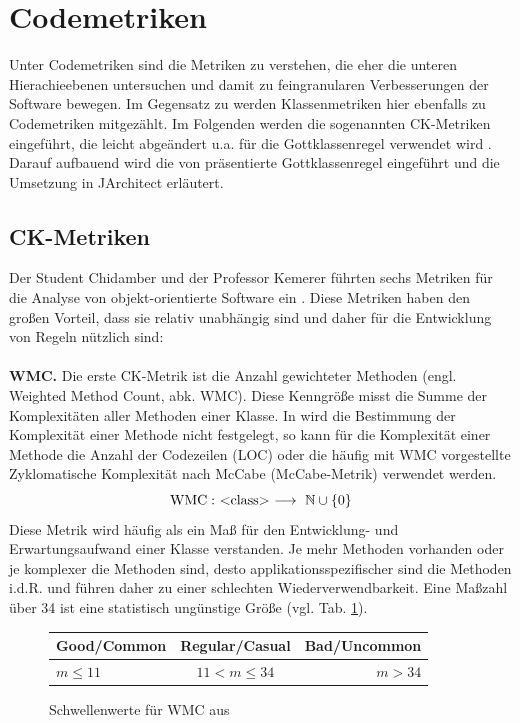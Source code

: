 \documentclass[12pt]{article}
\newcommand{\type}[1]{<\negthickspace\text{#1}\negthickspace> }
\begin{document}
\section{Codemetriken}\label{codem}

Unter Codemetriken sind die Metriken zu verstehen, die eher die
unteren Hierachieebenen untersuchen und damit zu feingranularen
Verbesserungen der Software bewegen. Im Gegensatz zu \cite{Sne10}
werden Klassenmetriken hier ebenfalls zu Codemetriken mitgezählt.
Im Folgenden werden die sogenannten CK-Metriken eingeführt, die
leicht abgeändert u.a. für die Gottklassenregel verwendet wird
\cite{Mar04}. Darauf aufbauend wird die von \cite{Mar04}
präsentierte Gottklassenregel eingeführt und die Umsetzung in
JArchitect erläutert. 

\subsection{CK-Metriken}
\label{sec:CK-Metriken}
Der Student Chidamber und der Professor Kemerer führten sechs
Metriken für die Analyse von objekt-orientierte Software ein
\cite{chi94}. Diese Metriken haben den großen Vorteil, dass sie
relativ unabhängig sind und daher für die Entwicklung von Regeln
nützlich sind: 
~\\
\\
\textbf{WMC.} Die erste CK-Metrik ist die Anzahl gewichteter Methoden
(engl. Weighted Method Count, abk. WMC). Diese Kenngröße
misst die Summe der Komplexitäten aller Methoden einer Klasse.
In \cite{chi94} wird die Bestimmung der Komplexität einer Methode
nicht festgelegt, so kann für die Komplexität einer Methode die
Anzahl der Codezeilen (LOC) oder die häufig mit WMC vorgestellte
Zyklomatische Komplexität nach McCabe (McCabe-Metrik) verwendet werden.
\[
        \text{WMC}: ~ 
        \type{class}
        ~ \longrightarrow ~ \mathbb{N}  \cup \left\{ 0 \right\} 
\]
Diese Metrik wird häufig als ein Maß für den Entwicklung- und
Erwartungsaufwand einer Klasse verstanden. Je mehr Methoden
vorhanden oder je komplexer die Methoden sind, desto
applikationsspezifischer sind die Methoden i.d.R. und führen
daher zu einer schlechten Wiederverwendbarkeit. Eine Maßzahl über
34 ist eine statistisch ungünstige Größe (vgl.
Tab. \ref{tab:wmcthreshold}).
\begin{figure}[H]
\centering
 \begin{tabular}{lcr}
    \toprule
    Good/Common & Regular/Casual & Bad/Uncommon \\
    \midrule
    $m \leq 11$ & $11 < m \leq 34$ & $m > 34$ \\
    \bottomrule
  \end{tabular}
  \caption{Schwellenwerte für WMC aus \cite{Fil15}}
  \label{tab:wmcthreshold}
\end{figure}
\end{document}
